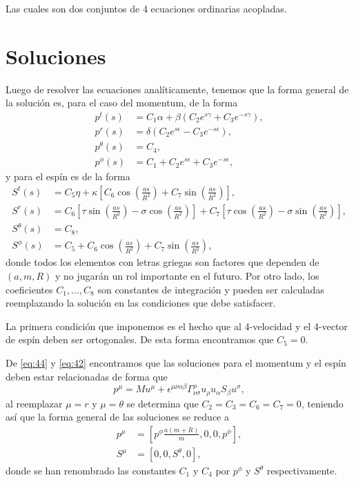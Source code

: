 Las cuales son dos conjuntos de 4 ecuaciones ordinarias acopladas.

\section{Soluciones}

Luego de resolver las ecuaciones analíticamente, tenemos que la forma general de la solución es, para el caso del momentum, de la forma
\begin{align}
p^t(s) &= C_1 \alpha + \beta \left( C_2 e^{s \gamma} + C_3 e^{-s \gamma} \right),\\
p^r(s) &= \delta \left( C_2 e^{s \epsilon} - C_3 e^{-s \epsilon} \right),\\
p^{\theta}(s) &= C_4,\\
p^{\phi}(s) &= C_1 + C_2 e^{s \epsilon} + C_3 e^{-s \epsilon},
\end{align}
y para el espín es de la forma
\begin{align}
S^t(s) &= C_5 \eta + \kappa \left[ C_6 \cos\left(\frac{as}{R^2} \right) + C_7 \sin\left(\frac{as}{R^2} \right) \right],\\
S^r(s) &= C_6 \left[ \tau \sin\left(\frac{as}{R^2} \right) - \sigma \cos\left(\frac{as}{R^2} \right) \right] 
+ C_7 \left[ \tau \cos\left(\frac{as}{R^2} \right) - \sigma \sin\left(\frac{as}{R^2} \right) \right],\\
S^{\theta}(s) &= C_8,\\
S^{\phi}(s) &= C_5 + C_6 \cos\left(\frac{as}{R^2} \right) + C_7 \sin\left(\frac{as}{R^2} \right),
\end{align}
donde todos los elementos con letras griegas son factores que dependen de $(a,m,R)$ y no jugarán un rol importante en el futuro. Por otro lado, los coeficientes $C_1, \dots, C_8$ son constantes de integración y pueden ser calculadas reemplazando la solución en las condiciones que debe satisfacer.

La primera condición que imponemos es el hecho que al 4-velocidad y el 4-vector de espín deben ser ortogonales. De esta forma encontramos que $C_5=0$.

De \eqref{eq:44} y \eqref{eq:42} encontramos que las soluciones para el momentum y el espín deben estar relacionadas de forma que
\begin{equation}
p^{\mu} = M u^{\mu} + \epsilon^{\mu \nu \alpha \beta} \Gamma^{\rho}_{\nu \sigma} u_{\rho} u_{\alpha} S_{\beta} u^{\sigma},
\end{equation}
al reemplazar $\mu=r$ y $\mu=\theta$ se determina que $C_2 = C_3 = C_6 = C_7 = 0$, teniendo así que la forma general de las soluciones se reduce a 
\begin{align}
\label{eq:73}
p^{\mu} &= \left[ p^{\phi} \frac{a(m+R)}{m}, 0, 0, p^{\phi} \right],\\
\label{eq:74}
S^{\mu} &= \left[ 0,0,S^{\theta},0 \right],
\end{align}
donde se han renombrado las constantes $C_1$ y $C_4$ por $p^{\phi}$ y $S^{\theta}$ respectivamente.

